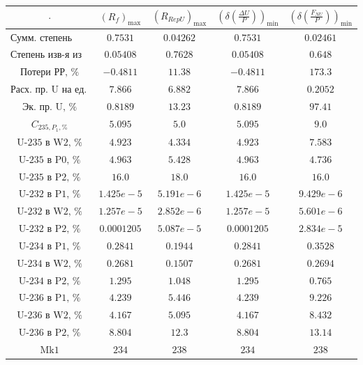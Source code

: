 \begin{table}
    \begin{tabular}{ccccc}
        $\cdot$ & $(R_f)_\text{max}$ & $(R_{RepU})_\text{max}$ & $(\delta(\frac{\Delta U}{P}))_\text{min}$ & $(\delta(\frac{F_{NU}}{P}))_\text{min}$\\ \hline
        $\text{Сумм. степень изв-я}$ & $0.7531$ & $0.04262$ & $0.7531$ & $0.02461$\\ \hline
        $\text{Степень изв-я из рег-та}$ & $0.05408$ & $0.7628$ & $0.05408$ & $0.648$\\ \hline
        $\text{Потери РР, \%}$ & $-0.4811$ & $11.38$ & $-0.4811$ & $173.3$\\ \hline
        $\text{Расх. пр. U на ед. прод.}$ & $7.866$ & $6.882$ & $7.866$ & $0.2052$\\ \hline
        $\text{Эк. пр. U, \%}$ & $0.8189$ & $13.23$ & $0.8189$ & $97.41$\\ \hline
        $C_{235,P_1, \%}$ & $5.095$ & $5.0$ & $5.095$ & $9.0$\\ \hline
        $\text{U-235 в W2, \%}$ & $4.923$ & $4.334$ & $4.923$ & $7.583$\\ \hline
        $\text{U-235 в P0, \%}$ & $4.963$ & $5.428$ & $4.963$ & $4.736$\\ \hline
        $\text{U-235 в P2, \%}$ & $16.0$ & $18.0$ & $16.0$ & $16.0$\\ \hline
        $\text{U-232 в P1, \%}$ & $1.425e-5$ & $5.191e-6$ & $1.425e-5$ & $9.429e-6$\\ \hline
        $\text{U-232 в W2, \%}$ & $1.257e-5$ & $2.852e-6$ & $1.257e-5$ & $5.601e-6$\\ \hline
        $\text{U-232 в P2, \%}$ & $0.0001205$ & $5.087e-5$ & $0.0001205$ & $2.834e-5$\\ \hline
        $\text{U-234 в P1, \%}$ & $0.2841$ & $0.1944$ & $0.2841$ & $0.3528$\\ \hline
        $\text{U-234 в W2, \%}$ & $0.2681$ & $0.1507$ & $0.2681$ & $0.2694$\\ \hline
        $\text{U-234 в P2, \%}$ & $1.295$ & $1.048$ & $1.295$ & $0.765$\\ \hline
        $\text{U-236 в P1, \%}$ & $4.239$ & $5.446$ & $4.239$ & $9.226$\\ \hline
        $\text{U-236 в W2, \%}$ & $4.167$ & $5.095$ & $4.167$ & $8.432$\\ \hline
        $\text{U-236 в P2, \%}$ & $8.804$ & $12.3$ & $8.804$ & $13.14$\\ \hline
        $\text{Mk1}$ & $234$ & $238$ & $234$ & $238$\\ \hline

\end{tabular}
\end{table}
